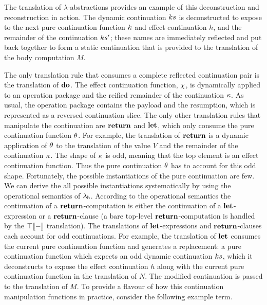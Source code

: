 \documentclass[12pt,phd,lfcs,twoside,openright,logo,leftchapter,normalheadings]{infthesis}
\theoremstyle{plain}
\theoremstyle{definition}
\begin{document}
The translation of $\lambda$-abstractions provides an example of this
deconstruction and reconstruction in action. The dynamic continuation
$ks$ is deconstructed to expose to the next pure continuation
function $k$ and effect continuation $h$, and the remainder of the
continuation $ks'$; these names are immediately reflected and put
back together to form a static continuation that is provided to the
translation of the body computation $M$.

The only translation rule that consumes a complete reflected
continuation pair is the translation of $\mathbf{do}$. The effect continuation
function, $\chi$, is dynamically applied to an operation package and
the reified remainder of the continuation $\kappa$. As usual, the
operation package contains the payload and the resumption, which is
represented as a reversed continuation slice.
%
The only other translation rules that manipulate the continuation are
$\mathbf{return}$ and $\mathbf{let}$, which only consume the pure continuation
function $\theta$. For example, the translation of $\mathbf{return}$ is a dynamic
application of $\theta$ to the translation of the value $V$ and the
remainder of the continuation $\kappa$.
%
The shape of $\kappa$ is odd, meaning that the top element is an effect
continuation function. Thus the pure continuation $\theta$ has to account
for this odd shape. Fortunately, the possible instantiations of the
pure continuation are few. We can derive the all possible
instantiations systematically by using the operational semantics of
$\lambda_{\mathsf{h}}$. According to the operational semantics the continuation of a
$\mathbf{return}$-computation is either the continuation of a
$\mathbf{let}$-expression or a $\mathbf{return}$-clause (a bare top-level
$\mathbf{return}$-computation is handled by the $\top\llbracket - \rrbracket$ translation).
%
The translations of $\mathbf{let}$-expressions and $\mathbf{return}$-clauses each
account for odd continuations. For example, the translation of $\mathbf{let}$
consumes the current pure continuation function and generates a
replacement: a pure continuation function which expects an odd dynamic
continuation $ks$, which it deconstructs to expose the effect
continuation $h$ along with the current pure continuation function in
the translation of $N$. The modified continuation is passed to the
translation of $M$.
%
To provide a flavour of how this continuation manipulation functions
in practice, consider the following example term.
%
\end{document}
